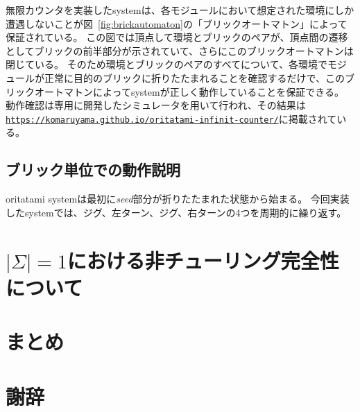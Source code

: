 \documentclass[a4j,11pt]{article}
\begin{document}
無限カウンタを実装したsystemは、各モジュールにおいて想定された環境にしか遭遇しないことが図~\ref{fig:brickautomaton}の「ブリックオートマトン」によって保証されている。
この図では頂点して環境とブリックのペアが、頂点間の遷移としてブリックの前半部分が示されていて、さらにこのブリックオートマトンは閉じている。
そのため環境とブリックのペアのすべてについて、各環境でモジュールが正常に目的のブリックに折りたたまれることを確認するだけで、このブリックオートマトンによってsystemが正しく動作していることを保証できる。
動作確認は専用に開発したシミュレータを用いて行われ、その結果は\href{https://komaruyama.github.io/oritatami-infinit-counter/}{\texttt{https://komaruyama.github.io/oritatami-infinit-counter/}}に掲載されている。


\subsection{ブリック単位での動作説明}
oritatami systemは最初に\textit{seed}部分が折りたたまれた状態から始まる。
今回実装したsystemでは、ジグ、左ターン、ジグ、右ターンの4つを周期的に繰り返す。

\section{$| \Sigma | = 1$における非チューリング完全性について}

\section{まとめ}

\section{謝辞}



\end{document}
